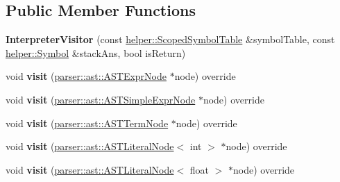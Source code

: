 \subsection*{Public Member Functions}
\begin{DoxyCompactItemize}
\item 
\mbox{\label{classvisitor_1_1InterpreterVisitor_a41fe83fe34750c37dffe4854eb0ad009}} 
{\bfseries Interpreter\+Visitor} (const \hyperlink{classvisitor_1_1helper_1_1ScopedSymbolTable}{helper\+::\+Scoped\+Symbol\+Table} \&symbol\+Table, const \hyperlink{structvisitor_1_1helper_1_1Symbol}{helper\+::\+Symbol} \&stack\+Ans, bool is\+Return)
\item 
\mbox{\label{classvisitor_1_1InterpreterVisitor_a82eb95cfdc93a496fac621cab4c8f81b}} 
void {\bfseries visit} (\hyperlink{classparser_1_1ast_1_1ASTExprNode}{parser\+::ast\+::\+A\+S\+T\+Expr\+Node} $\ast$node) override
\item 
\mbox{\label{classvisitor_1_1InterpreterVisitor_acbaa5d4aead1a8f515e2dfb05cee5fc0}} 
void {\bfseries visit} (\hyperlink{classparser_1_1ast_1_1ASTSimpleExprNode}{parser\+::ast\+::\+A\+S\+T\+Simple\+Expr\+Node} $\ast$node) override
\item 
\mbox{\label{classvisitor_1_1InterpreterVisitor_a0fa4dac52a77eff5e233e0e3e36877fb}} 
void {\bfseries visit} (\hyperlink{classparser_1_1ast_1_1ASTTermNode}{parser\+::ast\+::\+A\+S\+T\+Term\+Node} $\ast$node) override
\item 
\mbox{\label{classvisitor_1_1InterpreterVisitor_adcc7dd80162847093191d9ba297b59be}} 
void {\bfseries visit} (\hyperlink{classparser_1_1ast_1_1ASTLiteralNode}{parser\+::ast\+::\+A\+S\+T\+Literal\+Node}$<$ int $>$ $\ast$node) override
\item 
\mbox{\label{classvisitor_1_1InterpreterVisitor_a8020c5c81d73331c1f62a40c5379eab2}} 
void {\bfseries visit} (\hyperlink{classparser_1_1ast_1_1ASTLiteralNode}{parser\+::ast\+::\+A\+S\+T\+Literal\+Node}$<$ float $>$ $\ast$node) override
\item 
\mbox{\label{classvisitor_1_1InterpreterVisitor_a7354dfa5bc61a9a0772cd9bc97a21b1e}} 

\end{DoxyCompactItemize}
